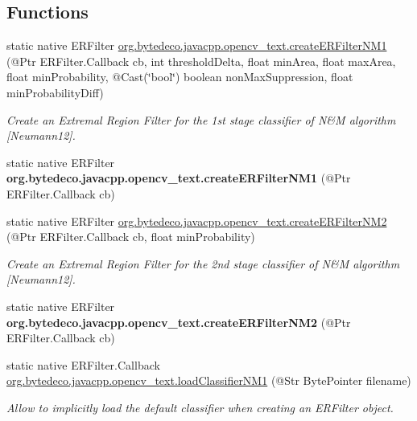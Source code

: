 \subsection*{Functions}
\begin{DoxyCompactItemize}
\item 
static native E\+R\+Filter \hyperlink{group__text__detect_ga0c01c194688152f569f28f7845cbfbaf}{org.\+bytedeco.\+javacpp.\+opencv\+\_\+text.\+create\+E\+R\+Filter\+N\+M1} (@Ptr E\+R\+Filter.\+Callback cb, int threshold\+Delta, float min\+Area, float max\+Area, float min\+Probability, @Cast(\char`\"{}bool\char`\"{}) boolean non\+Max\+Suppression, float min\+Probability\+Diff)
\begin{DoxyCompactList}\small\item\em Create an Extremal Region Filter for the 1st stage classifier of N\&M algorithm \mbox{[}Neumann12\mbox{]}. \end{DoxyCompactList}\item 
\mbox{\label{group__text__detect_gae88ae776bf76b390b5ca35a3a4d6b1c6}} 
static native E\+R\+Filter {\bfseries org.\+bytedeco.\+javacpp.\+opencv\+\_\+text.\+create\+E\+R\+Filter\+N\+M1} (@Ptr E\+R\+Filter.\+Callback cb)
\item 
static native E\+R\+Filter \hyperlink{group__text__detect_ga941eba7519bae9c44d6cbd21d21ad26e}{org.\+bytedeco.\+javacpp.\+opencv\+\_\+text.\+create\+E\+R\+Filter\+N\+M2} (@Ptr E\+R\+Filter.\+Callback cb, float min\+Probability)
\begin{DoxyCompactList}\small\item\em Create an Extremal Region Filter for the 2nd stage classifier of N\&M algorithm \mbox{[}Neumann12\mbox{]}. \end{DoxyCompactList}\item 
\mbox{\label{group__text__detect_ga577ae6c3236307ae6dfc2e590f41118a}} 
static native E\+R\+Filter {\bfseries org.\+bytedeco.\+javacpp.\+opencv\+\_\+text.\+create\+E\+R\+Filter\+N\+M2} (@Ptr E\+R\+Filter.\+Callback cb)
\item 
static native E\+R\+Filter.\+Callback \hyperlink{group__text__detect_gaa43a04b9408663608d30f5bcdaadac16}{org.\+bytedeco.\+javacpp.\+opencv\+\_\+text.\+load\+Classifier\+N\+M1} (@Str Byte\+Pointer filename)
\begin{DoxyCompactList}\small\item\em Allow to implicitly load the default classifier when creating an E\+R\+Filter object. \end{DoxyCompactList}\item 

\end{DoxyCompactItemize}
